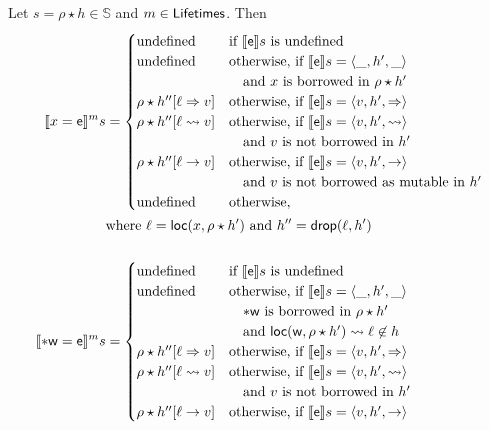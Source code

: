 \begin{definition}\label{def:semantics_terms}
  Let $s=\rho\star h\in\mathbb{S}$ and $m\in\Lifetimes$. Then
  \begin{align*}
    \denl[x=\mathsf{e}]{m}{s}&=
    \begin{cases}
      \text{undefined} & \text{if $\den[\mathsf{e}]{s}$ is undefined}\\
      \text{undefined} & \text{otherwise, if $\den[\mathsf{e}]{s}=\langle\_,h',\_\rangle$}\\
      & \quad\text{and $x$ is borrowed in $\rho\star h'$}\\
      \rho\star h''[\ell\Rightarrow v] & \text{otherwise, if $\den[\mathsf{e}]{s}=\langle v,h',\Rightarrow\rangle$}\\
      \rho\star h''[\ell\leadsto v] & \text{otherwise, if $\den[\mathsf{e}]{s}=\langle v,h',\leadsto\rangle$}\\
      & \quad\text{and $v$ is not borrowed in $h'$}\\
      \rho\star h''[\ell\to v] & \text{otherwise, if $\den[\mathsf{e}]{s}=\langle v,h',\to\rangle$}\\
      & \quad\text{and $v$ is not borrowed as mutable in $h'$}\\
      \text{undefined} & \text{otherwise,}
    \end{cases}\\
    &\text{where $\ell=\loc(x,\rho\star h')$ and $h''=\drop(\ell,h')$}\\
    \mbox{}\\
    \denl[*\mathsf{w}=\mathsf{e}]{m}{s}&=
    \begin{cases}
      \text{undefined} & \text{if $\den[\mathsf{e}]{s}$ is undefined}\\
      \text{undefined} & \text{otherwise, if $\den[\mathsf{e}]{s}=\langle\_,h',\_\rangle$}\\
      & \quad\text{$*\mathsf{w}$ is borrowed in $\rho\star h'$}\\
      & \quad\text{and $\loc(\mathsf{w},\rho\star h')\leadsto\ell\not\in h$}\\
      \rho\star h''[\ell\Rightarrow v] & \text{otherwise, if $\den[\mathsf{e}]{s}=\langle v,h',\Rightarrow\rangle$}\\
      \rho\star h''[\ell\leadsto v] & \text{otherwise, if $\den[\mathsf{e}]{s}=\langle v,h',\leadsto\rangle$}\\
      & \quad\text{and $v$ is not borrowed in $h'$}\\
      \rho\star h''[\ell\to v] & \text{otherwise, if $\den[\mathsf{e}]{s}=\langle v,h',\to\rangle$}\\

\end{cases}
\end{align*}
\end{definition}
